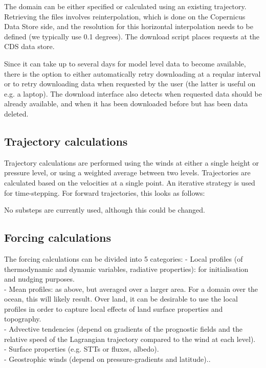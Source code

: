 \documentclass[a4paper,11pt]{article}
\begin{document}
The domain can be either specified or calculated using an existing
trajectory. Retrieving the files involves reinterpolation, which is
done on the Copernicus Data Store side, and the resolution for this
horizontal interpolation needs to be defined (we typically use 0.1
degrees). The download script places requests at the CDS data store.

Since it can take up to several days for model level data to become
available, there is the option to either automatically retry
downloading at a reqular interval or to retry downloading data when
requested by the user (the latter is useful on e.g. a laptop).
The download interface also detects when requested data should be
already available, and when it has been downloaded before but has been
data deleted.

\subsection{Trajectory calculations}

Trajectory calculations are performed using the winds at either a single
height or pressure level, or using a weighted average between two levels.
Trajectories are calculated based on the velocities at a single point.
An iterative strategy \citep{petterssen1956,sprenger2015} is used for
time-stepping. For forward trajectories, this looks as follows:

No substeps are currently used, although this could be changed.

\subsection{Forcing calculations}

The forcing calculations can be divided into 5 categories:
- Local profiles (of thermodynamic and dynamic variables, radiative
properties): for initialisation and nudging purposes. \\
- Mean profiles: as above, but averaged over a larger area. For a
domain over the ocean, this will likely result. Over land, it can be
desirable to use the local profiles in order to capture local effects
of land surface properties and topography. \\
- Advective tendencies (depend on gradients of the prognostic fields
and the relative speed of the Lagrangian trajectory compared to the wind
at each level). \\
- Surface properties (e.g. STTs or fluxes, albedo). \\
- Geostrophic winds (depend on pressure-gradients and latitude).. \\
\end{document}
